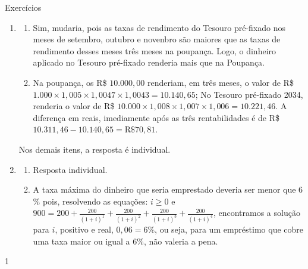 \begin{answer}{Exercícios}
{\exerciselist
  \begin{enumerate}
    \item 
    \begin{enumerate}
      \item Sim, mudaria, pois as taxas de rendimento do Tesouro pré-fixado nos meses de setembro, outubro e novenbro são maiores que as taxas de rendimento desses meses três meses na poupança. Logo, o dinheiro aplicado no Tesouro pré-fixado renderia mais que na Poupança.
      \item Na poupança, os R\$ $10.000,00$ renderiam, em três meses, o valor de R\$ $1.000\times1{,}005\times1{,}0047\times1{,}0043=10.140{,}65$; No Tesouro pré-fixado 2034, renderia o valor de R\$ $10.000\times 1{,}008\times 1{,}007\times 1{,}006=10.221{,}46$. A diferença em reais, imediamente após as três rentabilidades é de R\$ $10.311{,}46-10.140{,}65=\text{R\$ }70{,}81$.

    \end{enumerate}
    Nos demais itens, a resposta é individual.
    \item
    \begin{enumerate}
      \item Resposta individual.
      \item A taxa máxima do dinheiro que seria emprestado deveria ser menor que $6$\% pois, resolvendo as equações: $i\geq0$ e $900=\displaystyle200+\frac{200}{(1+i)^1}+\frac{200}{(1+i)^2}+\frac{200}{(1+i)^3}+\frac{200}{(1+i)^4}$, encontramos a solução para $i$,  positivo e real, $0{,}06=6$\%, ou seja, para um empréstimo que cobre uma taxa maior ou igual a $6$\%, não valeria a pena.
    \end{enumerate}
  \end{enumerate}
}{1}
\end{answer}
\clearmargin

